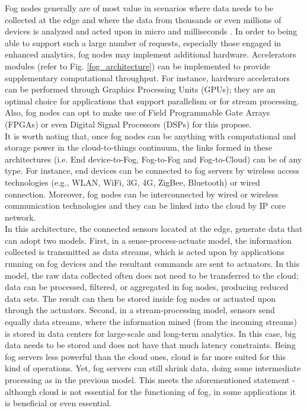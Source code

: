 \noindent\tab Fog nodes generally are of most value in scenarios where data needs to be collected at the edge and where the data from thousands or even millions of devices is analyzed and acted upon in micro and milliseconds \cite{openfog2017openfog}. In order to being able to support such a large number of requests, especially those engaged in enhanced analytics, fog nodes may implement additional hardware. Accelerators modules (refer to Fig. \ref{fog_architecture}) can be implemented to provide supplementary computational throughput. For instance, hardware accelerators can be performed through Graphics Processing Units (GPUs); they are an optimal choice for applications that support parallelism or for stream processing. Also, fog nodes can opt to make use of Field Programmable Gate Arrays (FPGAs) or even Digital Signal Processors (DSPs) for this propose.\\
\noindent\tab It is worth noting that, once fog nodes can be anything with computational and storage power in the cloud-to-things continuum, the links formed in these architectures (i.e. End device-to-Fog, Fog-to-Fog and Fog-to-Cloud) can be of any type. For instance, end devices can be connected to fog servers by wireless access technologies (e.g., WLAN, WiFi, 3G, 4G, ZigBee, Bluetooth) or wired connection. Moreover, fog nodes can be interconnected by wired or wireless communication technologies and they can be linked into the cloud by IP core network.\\
\noindent\tab In this architecture, the connected sensors located at the edge, generate data that can adopt two models. First, in a sense-process-actuate model, the information collected is transmitted as data streams, which is acted upon by applications running on fog devices and the resultant commands are sent to actuators. In this model, the raw data collected often does not need to be transferred to the cloud; data can be processed, filtered, or aggregated in fog nodes, producing reduced data sets. The result can then be stored inside fog nodes or actuated upon through the actuators. Second, in a stream-processing model, sensors send equally data streams, where the information mined (from the incoming streams) is stored in data centers for large-scale and long-term analytics. In this case, big data needs to be stored and does not have that much latency constraints. Being fog servers less powerful than the cloud ones, cloud is far more suited for this kind of operations. Yet, fog servers can still shrink data, doing some intermediate processing as in the previous model. This meets the aforementioned statement - although cloud is not essential for the functioning of fog, in some applications it is beneficial or even essential.\\
